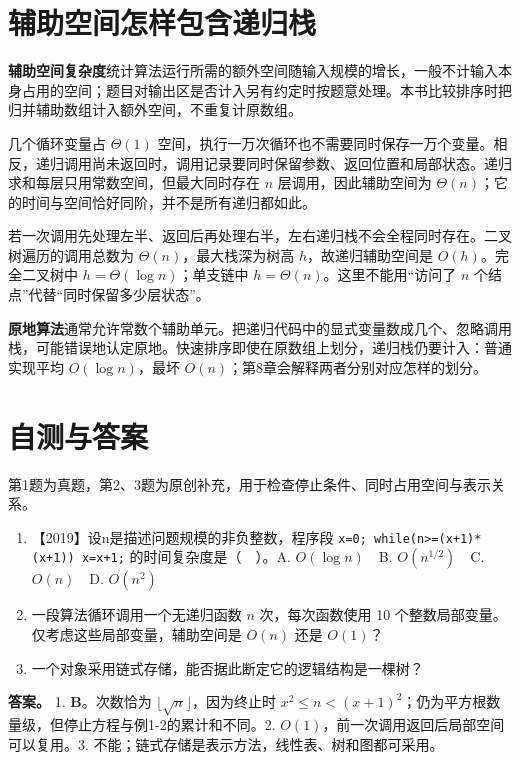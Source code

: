 \section{辅助空间怎样包含递归栈}\label{ds-01-04}

\textbf{辅助空间复杂度}统计算法运行所需的额外空间随输入规模的增长，一般不计输入本身占用的空间；题目对输出区是否计入另有约定时按题意处理。本书比较排序时把归并辅助数组计入额外空间，不重复计原数组。

几个循环变量占 \(\Theta(1)\) 空间，执行一万次循环也不需要同时保存一万个变量。相反，递归调用尚未返回时，调用记录要同时保留参数、返回位置和局部状态。递归求和每层只用常数空间，但最大同时存在 \(n\) 层调用，因此辅助空间为 \(\Theta(n)\)；它的时间与空间恰好同阶，并不是所有递归都如此。

若一次调用先处理左半、返回后再处理右半，左右递归栈不会全程同时存在。二叉树遍历的调用总数为 \(\Theta(n)\)，最大栈深为树高 \(h\)，故递归辅助空间是 \(O(h)\)。完全二叉树中 \(h=\Theta(\log n)\)；单支链中 \(h=\Theta(n)\)。这里不能用``访问了 \(n\) 个结点''代替``同时保留多少层状态''。

\textbf{原地算法}通常允许常数个辅助单元。把递归代码中的显式变量数成几个、忽略调用栈，可能错误地认定原地。快速排序即使在原数组上划分，递归栈仍要计入：普通实现平均 \(O(\log n)\)，最坏 \(O(n)\)；第8章会解释两者分别对应怎样的划分。

\section{自测与答案}\label{ds-ch1-check}

第1题为真题，第2、3题为原创补充，用于检查停止条件、同时占用空间与表示关系。

\begin{enumerate}
\def\labelenumi{\arabic{enumi}.}
\tightlist
\item
  【2019】设n是描述问题规模的非负整数，程序段 \allowbreak{}\texttt{x=0;}\allowbreak{}\texttt{\ while(n\textgreater{}=(x+1)*(x+1))\ x=x+1;}\allowbreak{} 的时间复杂度是（　）。A. \(O(\log n)\)　B. \(O(n^{1/2})\)　C. \(O(n)\)　D. \(O(n^2)\)
\item
  一段算法循环调用一个无递归函数 \(n\) 次，每次函数使用 10 个整数局部变量。仅考虑这些局部变量，辅助空间是 \(O(n)\) 还是 \(O(1)\)？
\item
  一个对象采用链式存储，能否据此断定它的逻辑结构是一棵树？
\end{enumerate}

\textbf{答案。} 1. \textbf{B}。次数恰为 \(\lfloor\sqrt n\rfloor\)，因为终止时 \(x^2\le n<(x+1)^2\)；仍为平方根数量级，但停止方程与例1-2的累计和不同。2. \(O(1)\)，前一次调用返回后局部空间可以复用。3. 不能；链式存储是表示方法，线性表、树和图都可采用。

